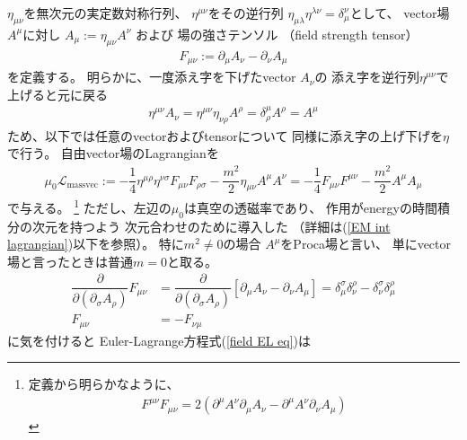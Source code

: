 $\eta_{\mu\nu}$を無次元の実定数対称行列、
$\eta^{\mu\nu}$をその逆行列
$\eta_{\mu\lambda} \eta^{\lambda \nu} = \delta_\mu^\nu$として、
vector場$A^\mu$に対し
$A_\mu := \eta_{\mu\nu} A^\nu$
および
場の強さテンソル
（field strength tensor）
\begin{align}
    F_{\mu\nu}
:=
    \partial_\mu A_\nu
    - \partial_\nu A_\mu
\label{field strength definition}
\end{align}
を定義する。
明らかに、一度添え字を下げたvector $A_\nu$の
添え字を逆行列$\eta^{\mu\nu}$で上げると元に戻る
\begin{align}
    \eta^{\mu\nu} A_\nu
    =
    \eta^{\mu\nu} \eta_{\nu \rho} A^\rho
    =
    \delta^\mu_\rho A^\rho
    =
    A^\mu
\end{align}
ため、以下では任意のvectorおよびtensorについて
同様に添え字の上げ下げを$\eta$で行う。
自由vector場のLagrangianを
\begin{align}
    \mu_0 \mathcal{L}_{\text{massvec}}
:=
    -
    \dfrac{1}{4}
        \eta^{\mu\rho}
        \eta^{\nu\sigma}
    F_{\mu\nu} F_{\rho\sigma}
    -
    \dfrac{m^2}{2}
        \eta_{\mu \nu}
        A^\mu A^\nu
=
    - \dfrac{1}{4}
    F_{\mu\nu} F^{\mu\nu}
    -
    \dfrac{m^2}{2}
		A^\mu A_\mu
\label{massive free vector lagrangian}
\end{align}
で与える。
\footnote{
    定義から明らかなように、
    \begin{align}
        F^{\mu \nu} F_{\mu \nu}
    = 2 (\partial^\mu A^\nu \partial_\mu A_\nu
    - \partial^\mu A^\nu \partial_\nu A_\mu)
    \end{align}
}
ただし、左辺の$\mu_0$は真空の透磁率であり、
作用がenergyの時間積分の次元を持つよう
次元合わせのために導入した
（詳細は(\ref{EM int lagrangian})以下を参照）。
特に$m^2 \neq 0$の場合
$A^\mu$をProca場と言い、
単にvector場と言ったときは普通$m = 0$と取る。
\begin{align}
    \dfrac{\partial}
        {\partial (\partial_\sigma A_\rho)}
    F_{\mu\nu}
    &=
    \dfrac{\partial}
        {\partial (\partial_\sigma A_\rho)}
    \left[
        \partial_\mu A_\nu
        - \partial_\nu A_\mu
    \right]
    =
    \delta_\mu^\sigma
    \delta_\nu^\rho
    -
    \delta_\nu^\sigma
    \delta_\mu^\rho
\\
    F_{\mu\nu} &= - F_{\nu\mu}
\end{align}
に気を付けると
Euler-Lagrange方程式(\ref{field EL eq})は
